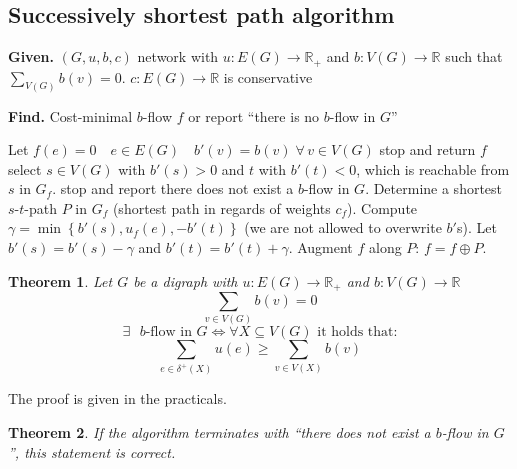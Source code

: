 \documentclass{article}
\newtheorem{theorem}{Theorem}
\newcommand{\set}[1]{\left\{#1\right\}}
\newcommand{\given}[1]{\textbf{Given.} #1\par}
\newcommand{\find}[1]{\textbf{Find.} #1\par}
\newcommand{\gath}[2]{$#1$-$#2$-path} %
\newcommand{\fall}{\;\forall\,}
\begin{document}
\subsection{Successively shortest path algorithm}
%
\begin{algorithm}
  \caption{Successively shortest path algorithm}
  \label{succ-shortest-path-algo}
  \given{$(G, u, b, c)$ network with $u: E(G) \rightarrow \mathbb{R}_+$ and $b: V(G) \rightarrow \mathbb{R}$ such that $\sum_{V(G)} b(v) = 0$. $c: E(G) \rightarrow \mathbb{R}$ is conservative}
  \find{Cost-minimal $b$-flow $f$ or report ``there is no $b$-flow in $G$''}
\begin{algorithmic}[1]
  \State Let $f(e) = 0 \quad e \in E(G) \quad b'(v) = b(v) \fall v \in V(G)$
    \If{$b'(v) = 0 \fall v \in V(G)$}\label{ssp-algo-step-2}
      \State stop and return $f$
    \Else
      \State select $s \in V(G)$ with $b'(s) > 0$ and $t$ with $b'(t) < 0$, which is reachable from $s$ in $G_f$.
        \State stop and report there does not exist a $b$-flow in $G$.
      \EndIf
    \EndIf
  \State Determine a shortest \gath st $P$ in $G_f$ (shortest path in regards of weights $c_f$).
  \State Compute $\gamma = \min\set{b'(s), u_f(e), -b'(t)}$ (we are not allowed to overwrite $b'$s).
  \State Let $b'(s) = b'(s) - \gamma$ and $b'(t) = b'(t) + \gamma$.
  \State Augment $f$ along $P$: $f = f \oplus P$.
\end{algorithmic}
\end{algorithm}

\begin{theorem}\label{lemma-5.10}
  Let $G$ be a digraph with $u: E(G) \rightarrow \mathbb{R}_+$ and $b: V(G) \rightarrow \mathbb{R}$
  \[ \sum_{v \in V(G)} b(v) = 0 \]
  \begin{equation*}
    \exists \text{ $b$-flow in } G \Leftrightarrow \forall X \subseteq V(G) \text{ it holds that:}
  \end{equation*} \begin{equation*}
    \sum_{e \in \delta^+(X)} u(e) \geq \sum_{v \in V(X)} b(v)
  \end{equation*}
\end{theorem}

The proof is given in the practicals.

\begin{theorem}\label{proposition-5.9}
  If the algorithm terminates with ``there does not exist a $b$-flow in $G$'',
  this statement is correct.
\end{theorem}
\end{document}
